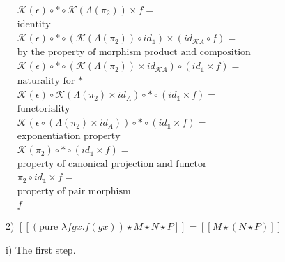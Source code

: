 \documentclass[a4paper]{article}
\begin{document}
$\begin{array}{lll}
&\mathcal{K}(\epsilon) \circ \ast \circ \mathcal{K}(\Lambda(\pi_2)) \times f = & \\
&\text{identity}& \\
&\mathcal{K}(\epsilon) \circ \ast \circ (\mathcal{K}(\Lambda(\pi_2)) \circ id_{\mathds{1}}) \times (id_{\mathcal{K}A} \circ f)  = & \\
&\text{by the property of morphism product and composition}& \\
&\mathcal{K}(\epsilon) \circ \ast \circ (\mathcal{K}(\Lambda(\pi_2)) \times id_{\mathcal{K}A}) \circ (id_{\mathds{1}} \times f) = & \\
&\text{naturality for $\ast$}& \\
&\mathcal{K}(\epsilon) \circ \mathcal{K}(\Lambda(\pi_2) \times id_A) \circ \ast \circ (id_{\mathds{1}} \times f) = & \\
&\text{functoriality}& \\
&\mathcal{K}(\epsilon \circ (\Lambda(\pi_2) \times id_A)) \circ \ast \circ (id_{\mathds{1}} \times f) =& \\
&\text{exponentiation property}& \\
&\mathcal{K}(\pi_2) \circ \ast \circ (id_{\mathds{1}} \times f) = & \\
&\text{property of canonical projection and functor}& \\
&\pi_2 \circ id_{\mathds{1}} \times f = & \\
&\text{property of pair morphism}& \\
&f&
\end{array}$

\vspace{\baselineskip}


\vspace{\baselineskip}



\vspace{\baselineskip}

\newpage

2) $[\![(\text{pure } \lambda f g x. f (g x)) \star M \star N \star P]\!] = [\![M \star (N \star P)]\!]$

\vspace{\baselineskip}

i) The first step.
\end{document}

